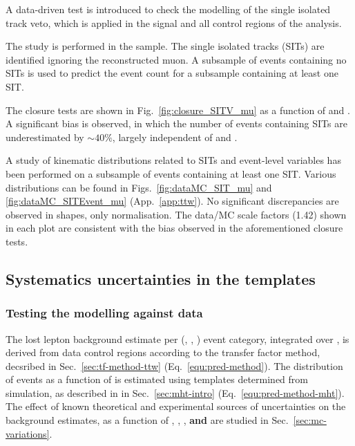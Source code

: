 A data-driven test is introduced to check the modelling of the single
isolated track veto, which is applied in the signal and all control
regions of the analysis.

The study is performed in the \mj sample. The single isolated tracks
(SITs) are identified ignoring the reconstructed muon. A subsample of
events containing no SITs is used to predict the event count for a
subsample containing at least one SIT. 

The closure tests are shown in Fig.~\ref{fig:closure_SITV_mu} as a
function of \scalht and \njet. A significant bias is observed, in
which the number of events containing SITs are underestimated by $\sim
40\%$, largely independent of \scalht and \njet. 

A study of kinematic distributions related to SITs and event-level
variables has been performed on a subsample of \mj events containing
at least one SIT. Various distributions can be found in
Figs.~\ref{fig:dataMC_SIT_mu} and \ref{fig:dataMC_SITEvent_mu}
(App.~\ref{app:ttw}). No significant discrepancies are observed in
shapes, only normalisation. The data/MC scale factors (1.42) shown in
each plot are consistent with the bias observed in the aforementioned
closure tests.

\subsection{Systematics uncertainties in the \texorpdfstring{\HTmiss}{MHT} templates}
\label{sec:mht}

\subsubsection{Testing the \texorpdfstring{\HTmiss}{MHT} modelling against data}

The lost lepton background estimate per (\njet, \scalht, \nb) event
category, integrated over \mht, is derived from data control regions
according to the transfer factor method, decsribed in
Sec.~\ref{sec:tf-method-ttw} (\eg Eq.~\ref{equ:pred-method}). The
distribution of events as a function of \HTmiss is estimated using
\mht templates determined from simulation, as described in in
Sec.~\ref{sec:mht-intro} (\eg Eq.~\ref{equ:pred-method-mht}).  The
effect of known theoretical and experimental sources of uncertainties
on the background estimates, as a function of \njet, \scalht, \nb,
{\bf and} \HTmiss are studied in
Sec.~\ref{sec:mc-variations}. 

